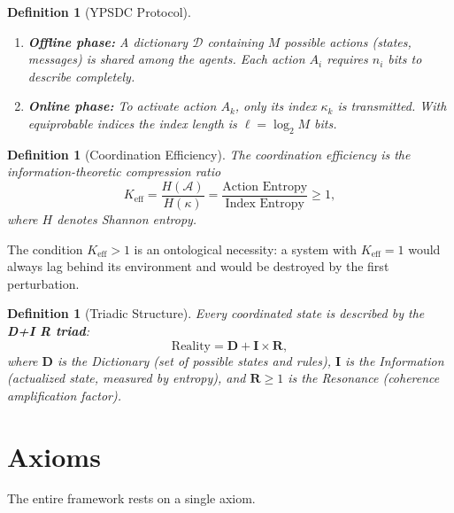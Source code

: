 \documentclass[12pt,a4paper]{article}
\newtheorem{definition}[theorem]{Definition}
\theoremstyle{remark}
\newcommand{\Keff}{K_{\mathrm{eff}}}
\begin{document}
	\begin{definition}[YPSDC Protocol]
		\begin{enumerate}[label=(\roman*)]
			\item \textbf{Offline phase:} A dictionary \(\mathcal{D}\) containing
			\(M\) possible actions (states, messages) is shared among the agents.
			Each action \(A_i\) requires \(n_i\) bits to describe completely.
			\item \textbf{Online phase:} To activate action \(A_k\), only its index
			\(\kappa_k\) is transmitted.  With equiprobable indices the index length
			is \(\ell = \log_2 M\) bits.
		\end{enumerate}
	\end{definition}
	
	\begin{definition}[Coordination Efficiency]
		The coordination efficiency is the information-theoretic compression ratio
		\begin{equation}
			\Keff = \frac{H(\mathcal{A})}{H(\kappa)} = \frac{\text{Action Entropy}}{\text{Index Entropy}} \ge 1,
			\label{eq:keff}
		\end{equation}
		where \(H\) denotes Shannon entropy.
	\end{definition}
	
	The condition \(K_{\mathrm{eff}} > 1\) is an ontological necessity: a system with
	\(K_{\mathrm{eff}} = 1\) would always lag behind its environment and would be
	destroyed by the first perturbation.
	
	\begin{definition}[Triadic Structure]
		Every coordinated state is described by the \textbf{D+I R triad}:
		\[
		\text{Reality} = \mathbf{D} + \mathbf{I} \times \mathbf{R},
		\]
		where \(\mathbf{D}\) is the Dictionary (set of possible states and rules),
		\(\mathbf{I}\) is the Information (actualized state, measured by entropy),
		and \(\mathbf{R} \ge 1\) is the Resonance (coherence amplification factor).
	\end{definition}
	
	\section{Axioms}
	\label{sec:axioms}
	
	The entire framework rests on a single axiom.
	
\end{document}
